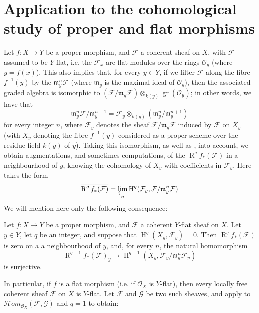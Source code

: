 \section{Application to the cohomological study of proper and flat morphisms }\label{fga2-5}

Let $f\colon X\to Y$ be a proper morphism, and $\mathcal{F}$ a coherent sheaf on $X$, with $\mathcal{F}$ assumed to be $Y$-flat, i.e. the $\mathcal{F}_x$ are flat modules over the rings $\mathcal{O}_y$ (where $y=f(x)$).
This also implies that, for every $y\in Y$, if we filter $\mathcal{F}$ along the fibre $f^{-1}(y)$ by the $\mathfrak{m}_y^n\mathcal{F}$ (where $\mathfrak{m}_y$ is the maximal ideal of $\mathcal{O}_y$), then the associated graded algebra is isomorphic to $(\mathcal{F}/\mathfrak{m}_y\mathcal{F})\otimes_{k(y)}\operatorname{gr}(\mathcal{O}_y)$;
in other words, we have that
\[\mathfrak{m}_y^n\mathcal{F}/\mathfrak{m}_y^{n+1} = \mathcal{F}_y\otimes_{k(y)}(\mathfrak{m}_y^n/\mathfrak{m}_y^{n+1})\]
for every integer $n$, where $\mathcal{F}_y$ denotes the sheaf $\mathcal{F}/\mathfrak{m}_y\mathcal{F}$ induced by $\mathcal{F}$ on $X_y$ (with $X_y$ denoting the fibre $f^{-1}(y)$ considered as a proper scheme over the residue field $k(y)$ of $y$).
Taking this isomorphism, as well as , into account, we obtain augmentations, and sometimes computations, of the $\operatorname{R}^q f_*(\mathcal{F})$ in a neighbourhood of $y$, knowing the cohomology of $X_y$ with coefficients in $\mathcal{F}_y$.
Here  takes the form
\[\overline{\operatorname{R}^q f_*(\mathcal{F})} = \varprojlim_n \operatorname{H}^q(\mathcal{F}_y,\mathcal{F}/\mathfrak{m}_y^n\mathcal{F})\]
We will mention here only the following consequence:

\begin{proposition}\label{fga2-proposition-1}
    Let $f\colon X\to Y$ be a proper morphism, and $\mathcal{F}$ a coherent $Y$-flat sheaf on $X$.
    Let $y\in Y$, let $q$ be an integer, and suppose that $\operatorname{H}^q(X_y,\mathcal{F}_y)=0$.
    Then $\operatorname{R}^q f_*(\mathcal{F})$ is zero on a a neighbourhood of $y$, and, for every $n$, the natural homomorphism
    \[\operatorname{R}^{q-1}f_*(\mathcal{F})_y \to \operatorname{H}^{q-1}(X_y,\mathcal{F}_y/\mathfrak{m}_y^n\mathcal{F}_y)\]
    is surjective.
\end{proposition}

In particular, if $f$ is a flat morphism (i.e. if $\mathcal{O}_X$ is $Y$-flat), then every locally free coherent sheaf $\mathcal{F}$ on $X$ is $Y$-flat.
Let $\mathcal{F}$ and $\mathcal{G}$ be two such sheaves, and apply  to $\mathcal{H}om_{\mathcal{O}_X}(\mathcal{F},\mathcal{G})$ and $q=1$ to obtain:

